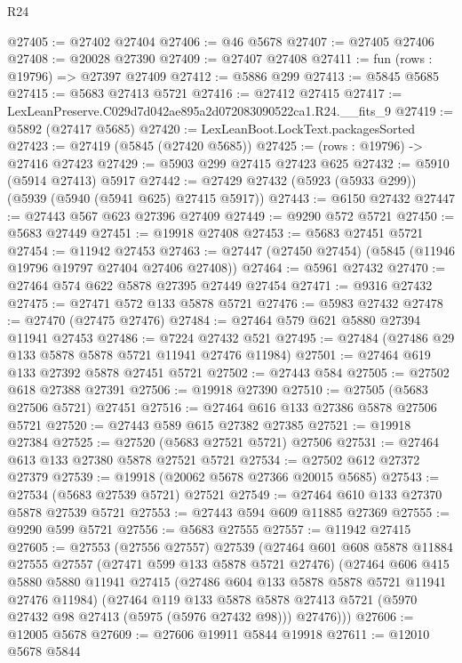 \begin{lexlean}{R24}
\begin{coremodule}
@27405 := @27402 @27404
@27406 := @46 @5678
@27407 := @27405 @27406
@27408 := @20028 @27390
@27409 := @27407 @27408
@27411 := fun (rows : @19796) => @27397 @27409
@27412 := @5886 @299
@27413 := @5845 @5685
@27415 := @5683 @27413 @5721
@27416 := @27412 @27415
@27417 := LexLeanPreserve.C029d7d042ae895a2d072083090522ca1.R24.__fits_9
@27419 := @5892 (@27417 @5685)
@27420 := LexLeanBoot.LockText.packagesSorted
@27423 := @27419 (@5845 (@27420 @5685))
@27425 := (rows : @19796) -> @27416 @27423
@27429 := @5903 @299 @27415 @27423 @625
@27432 := @5910 (@5914 @27413) @5917
@27442 := @27429 @27432 (@5923 (@5933 @299)) (@5939 (@5940 (@5941 @625) @27415 @5917))
@27443 := @6150 @27432
@27447 := @27443 @567 @623 @27396 @27409
@27449 := @9290 @572 @5721
@27450 := @5683 @27449
@27451 := @19918 @27408
@27453 := @5683 @27451 @5721
@27454 := @11942 @27453
@27463 := @27447 (@27450 @27454) (@5845 (@11946 @19796 @19797 @27404 @27406 @27408))
@27464 := @5961 @27432
@27470 := @27464 @574 @622 @5878 @27395 @27449 @27454
@27471 := @9316 @27432
@27475 := @27471 @572 @133 @5878 @5721
@27476 := @5983 @27432
@27478 := @27470 (@27475 @27476)
@27484 := @27464 @579 @621 @5880 @27394 @11941 @27453
@27486 := @7224 @27432 @521
@27495 := @27484 (@27486 @29 @133 @5878 @5878 @5721 @11941 @27476 @11984)
@27501 := @27464 @619 @133 @27392 @5878 @27451 @5721
@27502 := @27443 @584
@27505 := @27502 @618 @27388 @27391
@27506 := @19918 @27390
@27510 := @27505 (@5683 @27506 @5721) @27451
@27516 := @27464 @616 @133 @27386 @5878 @27506 @5721
@27520 := @27443 @589 @615 @27382 @27385
@27521 := @19918 @27384
@27525 := @27520 (@5683 @27521 @5721) @27506
@27531 := @27464 @613 @133 @27380 @5878 @27521 @5721
@27534 := @27502 @612 @27372 @27379
@27539 := @19918 (@20062 @5678 @27366 @20015 @5685)
@27543 := @27534 (@5683 @27539 @5721) @27521
@27549 := @27464 @610 @133 @27370 @5878 @27539 @5721
@27553 := @27443 @594 @609 @11885 @27369
@27555 := @9290 @599 @5721
@27556 := @5683 @27555
@27557 := @11942 @27415
@27605 := @27553
    (@27556 @27557)
    @27539
    (@27464
      @601
      @608
      @5878
      @11884
      @27555
      @27557
      (@27471 @599 @133 @5878 @5721 @27476)
      (@27464
        @606
        @415
        @5880
        @5880
        @11941
        @27415
        (@27486 @604 @133 @5878 @5878 @5721 @11941 @27476 @11984)
        (@27464
          @119
          @133
          @5878
          @5878
          @27413
          @5721
          (@5970 @27432 @98 @27413 (@5975 (@5976 @27432 @98)))
          @27476)))
@27606 := @12005 @5678
@27609 := @27606 @19911 @5844 @19918
@27611 := @12010 @5678 @5844

\end{coremodule}
\end{lexlean}
